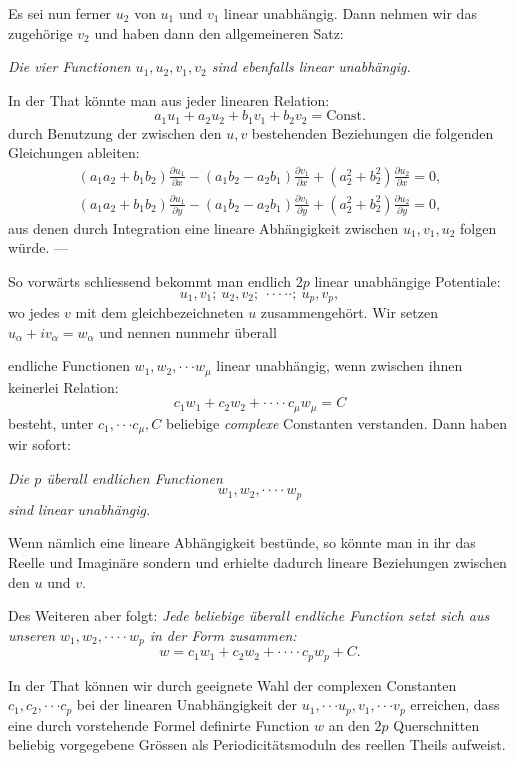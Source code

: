 \documentclass{article}
\begin{document}
Es sei nun ferner $u_{2}$ von $u_{1}$ und $v_{1}$ linear unabhängig. Dann nehmen wir das zugehörige $v_{2}$ und haben dann den allgemeineren Satz:

\emph{Die vier Functionen $u_{1}, u_{2}, v_{1}, v_{2}$ sind ebenfalls linear unabhängig.}

In der That könnte man aus jeder linearen Relation:
\[ a_{1}u_{1} + a_{2}u_{2} + b_{1}v_{1} + b_{2}v_{2} = \text{Const.} \]
durch Benutzung der zwischen den $u, v$ bestehenden Beziehungen die folgenden Gleichungen ableiten:
\[ \begin{gathered} (a_{1}a_{2} + b_{1}b_{2})\frac{\partial u_{1}}{\partial x} - (a_{1}b_{2} - a_{2}b_{1})\frac{\partial v_{1}}{\partial x} + (a_{2}^{2} + b_{2}^{2})\frac{\partial u_{2}}{\partial x} = 0, \\ (a_{1}a_{2} + b_{1}b_{2})\frac{\partial u_{1}}{\partial y} - (a_{1}b_{2} - a_{2}b_{1})\frac{\partial v_{1}}{\partial y} + (a_{2}^{2} + b_{2}^{2})\frac{\partial u_{2}}{\partial y} = 0, \end{gathered} \]
aus denen durch Integration eine lineare Abhängigkeit zwischen $u_{1}, v_{1}, u_{2}$ folgen würde. ---

So vorwärts schliessend bekommt man endlich $2p$ linear unabhängige Potentiale:
\[ u_{1}, v_{1};\ u_{2}, v_{2};\ \cdot\cdot\cdot\cdot\cdot;\ u_{p}, v_{p}, \]
wo jedes $v$ mit dem gleichbezeichneten $u$ zusammengehört. Wir setzen $u_{\alpha} + iv_{\alpha} = w_{\alpha}$ und nennen nunmehr überall

endliche Functionen $w_{1}, w_{2}, \cdot\cdot\cdot w_{\mu}$ linear unabhängig, wenn zwischen ihnen keinerlei Relation:
\[ c_{1}w_{1} + c_{2}w_{2} + \cdot\cdot\cdot\cdot c_{\mu}w_{\mu} = C \]
besteht, unter $c_{1}, \cdot\cdot\cdot c_{\mu}, C$ beliebige \emph{complexe} Constanten verstanden. Dann haben wir sofort:

\emph{Die $p$ überall endlichen Functionen}
\[ w_{1}, w_{2}, \cdot\cdot\cdot\cdot w_{p} \]
\emph{sind linear unabhängig.}

Wenn nämlich eine lineare Abhängigkeit bestünde, so könnte man in ihr das Reelle und Imaginäre sondern und erhielte dadurch lineare Beziehungen zwischen den $u$ und $v$.

Des Weiteren aber folgt: \emph{Jede beliebige überall endliche Function setzt sich aus unseren $w_{1}, w_{2}, \cdot\cdot\cdot\cdot w_{p}$ in der Form zusammen:}
\[ w = c_{1}w_{1} + c_{2}w_{2} + \cdot\cdot\cdot\cdot c_{p}w_{p} + C. \]

In der That können wir durch geeignete Wahl der complexen Constanten $c_{1}, c_{2}, \cdot\cdot\cdot c_{p}$ bei der linearen Unabhängigkeit der $u_{1}, \cdot\cdot\cdot u_{p}, v_{1}, \cdot\cdot\cdot v_{p}$ erreichen, dass eine durch vorstehende Formel definirte Function $w$ an den $2p$ Querschnitten beliebig vorgegebene Grössen als Periodicitätsmoduln des reellen Theils aufweist.
\end{document}
